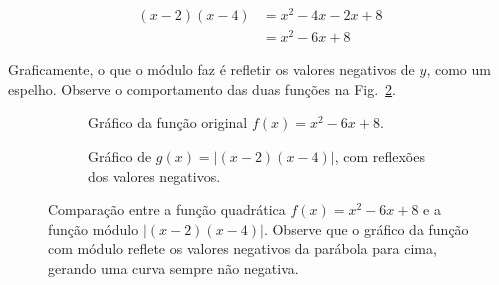 \documentclass[12pt,openright,twoside,a4paper]{article}
\theoremstyle{definition}
\begin{document}
	\begin{align*}
		(x-2)(x-4) &= x^2 - 4x - 2x + 8\\
		&=x^2 -6x + 8
	\end{align*}
	
	Graficamente, o que o módulo faz é refletir os valores negativos de $y$, como um espelho. Observe o comportamento das duas funções na Fig.~\ref{fig:modulo}.
	
	\begin{figure}[h]
		\centering
		
		\begin{subfigure}[t]{0.48\textwidth}
			\centering
			\caption{Gráfico da função original \( f(x) = x^2 - 6x + 8 \).}
			\label{fig:quadratica}
		\end{subfigure}
		\hfill
		\begin{subfigure}[t]{0.48\textwidth}
			\centering
			\caption{Gráfico de \( g(x) = |(x-2)(x-4)| \), com reflexões dos valores negativos.}
			\label{fig:modulo}
		\end{subfigure}
		
		\caption{Comparação entre a função quadrática \( f(x) = x^2 - 6x + 8 \) e a função módulo \( |(x-2)(x-4)| \). Observe que o gráfico da função com módulo reflete os valores negativos da parábola para cima, gerando uma curva sempre não negativa.}
		\label{fig:comparacao-funcao-modulo}
	\end{figure}
	
\end{document}
